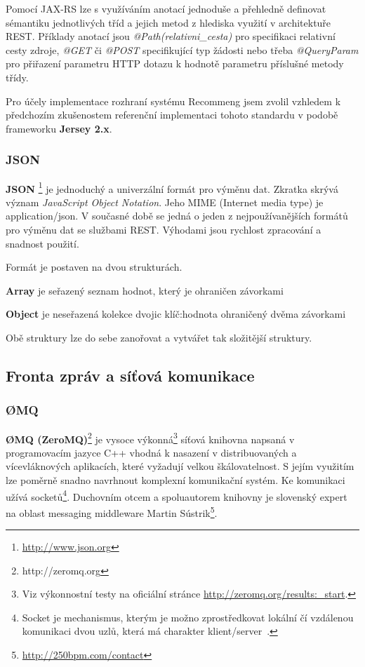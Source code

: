 \documentclass[thesis=M,czech]{FITthesis}[2014/05/07]
\begin{document}
Pomocí JAX-RS lze s využíváním anotací jednoduše a přehledně definovat sémantiku jednotlivých tříd a jejich metod z hlediska využití v architektuře REST. Příklady anotací jsou \emph{@Path(relativni\_cesta)} pro specifikaci relativní cesty zdroje, \emph{@GET} či \emph{@POST} specifikující typ žádosti nebo třeba \emph{@QueryParam} pro přiřazení parametru HTTP dotazu k hodnotě parametru příslušné metody třídy.

Pro účely implementace rozhraní systému Recommeng jsem zvolil vzhledem k předchozím zkušenostem referenční implementaci tohoto standardu v podobě frameworku \textbf{Jersey 2.x}. 

\subsubsection{JSON}
\textbf{JSON }\footnote{\url{http://www.json.org}} je jednoduchý a univerzální formát pro výměnu dat. Zkratka skrývá význam \emph{JavaScript Object Notation}. Jeho MIME (Internet media type) je application/json. V současné době se jedná o jeden z nejpoužívanějších formátů pro výměnu dat se službami REST. Výhodami jsou rychlost zpracování a snadnost použití.

Formát je postaven na dvou strukturách. 

\begin{description}
	\item \textbf{Array} je seřazený seznam hodnot, který je ohraničen závorkami
	\item \textbf{Object} je neseřazená kolekce dvojic klíč:hodnota ohraničený dvěma závorkami
\end{description}

Obě struktury lze do sebe zanořovat a vytvářet tak složitější struktury.

\subsection{Fronta zpráv a síťová komunikace}

\subsubsection{ØMQ}
\textbf{ØMQ (ZeroMQ)}\footnote{http://zeromq.org} je vysoce výkonná\footnote{Viz výkonnostní testy na oficiální stránce \url{http://zeromq.org/results:_start}.} síťová knihovna napsaná v programovacím jazyce C++ vhodná k nasazení v distribuovaných a vícevláknových aplikacích, které vyžadují velkou škálovatelnost. S jejím využitím lze poměrně snadno navrhnout komplexní komunikační systém. Ke komunikaci užívá socketů\footnote{Socket je mechanismus, kterým je možno zprostředkovat lokální čí vzdálenou komunikaci dvou uzlů, která má charakter klient/server~\cite{socket}.}. Duchovním otcem a spoluautorem knihovny je slovenský expert na oblast messaging middleware Martin Sústrik\footnote{\url{http://250bpm.com/contact}}.
\end{document}
